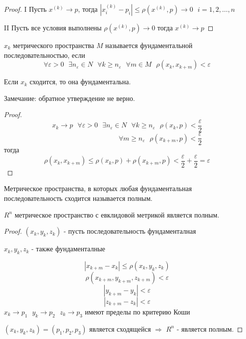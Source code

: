 \begin{proof}
  I Пусть $x^{(k)} \to p$, тогда $|x_i^{(k)} - p_i| \le \rho(x^{(k)}, p) \to 0
  ~~~ i = 1, 2, \ldots, n$

  II Пусть все условия выполнены $\rho(x^{(k)}, p) \to 0$ тогда $x^{(k)} \to p$
\end{proof}

\begin{define}
  $x_k$ метрического пространства $M$ называется фундаментальной
  последовательностью, если
  $$
  \forall \varepsilon > 0 ~~~ \exists n_{\varepsilon} \in N ~~~
  \forall k \ge n_{\varepsilon} ~~~ \forall m \in M ~~~ \rho(x_k, x_{k+m}) <
  \varepsilon
  $$
\end{define}

\begin{theorem}
  Если $x_k$ сходится, то она фундаментальна.

  Замечание: обратное утверждение не верно.
\end{theorem}

\begin{proof}
  $$
  x_k \to p ~~~ \forall \varepsilon > 0 ~~~ \exists n_{\varepsilon} \in N ~~~
  \forall k \ge n_{\varepsilon} ~~~ \rho(x_k, p) < \frac{\varepsilon}{2}
  $$
  $$
  ~~~~~~~~~~~~~~~~~~~~~~~~~~~~~~~~~~~~~~~~~~~~
  \forall m \ge n_{\varepsilon} ~~~ \rho(x_{k + m}, p) < \frac{\varepsilon}{2}
  $$
  тогда
  $$
  \rho(x_k, x_{k+m}) \le \rho(x_k, p) + \rho(x_{k+m}, p)
  < \frac{\varepsilon}{2} + \frac{\varepsilon}{2} = \varepsilon
  $$
\end{proof}

\begin{define}
  Метрическое пространства, в которых любая фундаментальная последовательность
  сходится называется полным.
\end{define}

\begin{theorem}
  $R^n$ метрическое пространство с евклидовой метрикой является полным.
\end{theorem}

\begin{proof}
  $(x_k, y_k, z_k)$ - пусть последовательность фундаменталная

  $x_k, y_k, z_k$ - также фундаменталные

  $$
  |x_{k+m} - x_k| \le \rho(x_k, y_k, z_k)
  $$
  $$
  \rho(x_{k+m}, y_{k+m}, z_{k+m}) < \varepsilon
  $$
  $$
  |y_{k+m} - y_k| < \varepsilon
  $$
  $$
  |z_{k+m} - z_k| < \varepsilon
  $$
  $x_k \to p_1 ~~~ y_k \to p_2 ~~~ z_k \to p_3$ имеют пределы по критерию Коши

  $(x_k, y_k, z_k) = (p_1, p_2, p_3)$ является сходящейся $\Rightarrow$ $R^n$
  - является полным.
\end{proof}

